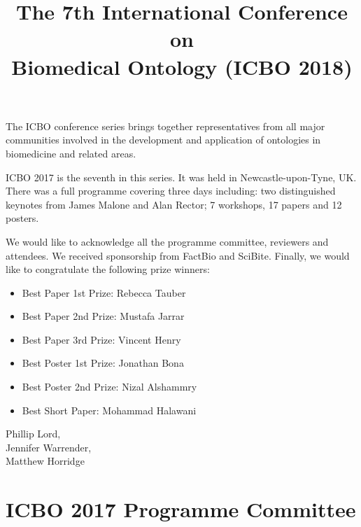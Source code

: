 \documentclass{article}
\title{The 7th International Conference on\\Biomedical Ontology (ICBO 2018)}
\date{}
\begin{document}
\parindent0pt
\parskip15pt
\maketitle

The ICBO conference series brings together representatives from all
major communities involved in the development and application of
ontologies in biomedicine and related areas.

ICBO 2017 is the seventh in this series. It was held in
Newcastle-upon-Tyne, UK. There was a full programme covering three
days including: two distinguished keynotes from James Malone and Alan
Rector; 7 workshops, 17 papers and 12 posters.

We would like to acknowledge all the programme committee, reviewers and
attendees. We received sponsorship from FactBio and SciBite. Finally, we would like to congratulate the following prize winners:

\begin{itemize}
\item Best Paper 1st Prize: Rebecca Tauber
\item Best Paper 2nd Prize: Mustafa Jarrar
\item Best Paper 3rd Prize: Vincent Henry
\item Best Poster 1st Prize: Jonathan Bona
\item Best Poster 2nd Prize: Nizal Alshammry
\item Best Short Paper: Mohammad Halawani
\end{itemize}

Phillip Lord,\\
Jennifer Warrender,\\
Matthew Horridge


\section*{ICBO 2017 Programme Committee}
\end{document}

